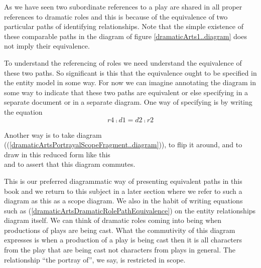 As we have seen two subordinate references to a play are shared in all proper references to dramatic roles 
and this is because of
the equivalence of two particular paths of identifying relationships. 
Note that the simple existence of these comparable paths in the diagram of figure \ref{dramaticArts1..diagram}
does not imply their equivalence.

To understand the referencing of roles we need understand the equivalence of these two paths. 
So significant is this that the equivalence ought to be specified in the entity model in some way.
For now we can imagine annotating the diagram in some way to indicate that these two paths are equivalent 
or else specifying in a separate document or in a separate diagram. 
One way of specifying is by writing the equation
\begin{equation}
\label{dramaticArtsDramaticRolePathEquivalence}
r4 \comp d1 = d2 \comp r2
\end{equation}

Another way is to take diagram ((\ref{dramaticArtsPortrayalScopeFragment..diagram})), 
to flip it  around, and to draw  in this reduced form like this
\begin{equation}
\label{dramaticArtsPortrayalScopeAppearance1}

\end{equation}
and to assert that this diagram commutes.

This is our preferred diagrammatic way of presenting equivalent paths in this book and we return to this subject in a later section where we refer to such a diagram as this as a scope diagram. 
We also in the habit of writing equations such as (\ref{dramaticArtsDramaticRolePathEquivalence}) on the entity relationships diagram itself.
We can think of dramatic roles coming into being when productions of plays are being cast. What the commutivity of this diagram expresses is when a production of a play is being cast then it is all characters from the play that are being cast not characters from plays in general. 
The relationship ``the portray of'', we say, is restricted in scope.



